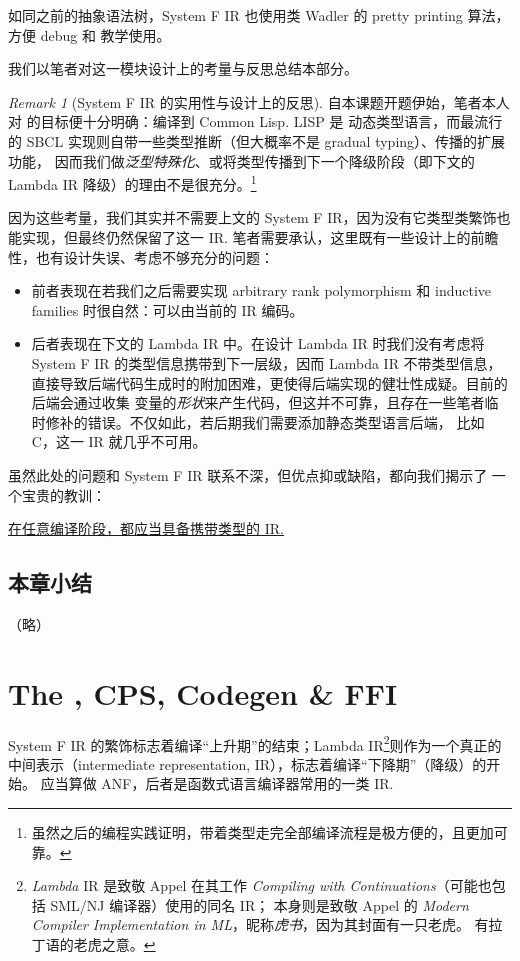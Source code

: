 \documentclass[a4paper, 11pt]{article}
\theoremstyle{remark}\newtheorem*{remark}{Remark}
\theoremstyle{definition}\newtheorem*{definition}{Definition}
\begin{document}
如同之前的抽象语法树，System F IR 也使用类 Wadler 的 pretty printing 算法，方便 debug 和
教学使用。

我们以笔者对这一模块设计上的考量与反思总结本部分。
\begin{remark}[System F IR 的实用性与设计上的反思]
  自本课题开题伊始，笔者本人对 \Tigris 的目标便十分明确：编译到 Common Lisp. LISP 是
  动态类型语言，而最流行的 SBCL 实现则自带一些类型推断（但大概率不是 gradual typing）、传播的扩展功能，
  因而我们做\emph{泛型特殊化}、或将类型传播到下一个降级阶段（即下文的 Lambda IR 降级）的理由不是很充分。\footnote{
    虽然之后的编程实践证明，带着类型走完全部编译流程是极方便的，且更加可靠。
  }

  因为这些考量，我们其实并不需要上文的 System F IR，因为没有它类型类繁饰也能实现，但最终仍然保留了这一 IR.
  笔者需要承认，这里既有一些设计上的前瞻性，也有设计失误、考虑不够充分的问题：
\begin{itemize}\itemsep0em
    \item 前者表现在若我们之后需要实现 arbitrary rank polymorphism 和 inductive families 时很自然：可以由当前的 IR 编码。
    \item 后者表现在下文的 Lambda IR 中。在设计 Lambda IR 时我们没有考虑将 System F IR 的类型信息携带到下一层级，因而
      Lambda IR 不带类型信息，直接导致后端代码生成时的附加困难，更使得后端实现的健壮性成疑。目前的后端会通过收集
      变量的\emph{形状}来产生代码，但这并不可靠，且存在一些笔者临时修补的错误。不仅如此，若后期我们需要添加静态类型语言后端，
      比如 C，这一 IR 就几乎不可用。
  \end{itemize}
  虽然此处的问题和 System F IR 联系不深，但优点抑或缺陷，都向我们揭示了
  一个宝贵的教训：
  \begin{center}
    \underline{在任意编译阶段，都应当具备携带类型的 IR.}
  \end{center}
\end{remark}

\subsection{本章小结}（略）

\section{The \Lambdair, CPS, Codegen \& FFI}
System F IR 的繁饰标志着编译“上升期”的结束；Lambda IR\footnote{
  \emph{Lambda} IR 是致敬 Appel 在其工作 \emph{Compiling with Continuations}（可能也包括 SML/NJ 编译器）使用的同名 IR；
  \Tigris 本身则是致敬 Appel 的 \emph{Modern Compiler Implementation in ML}，昵称\emph{虎书}，因为其封面有一只老虎。
  \Tigris 有拉丁语的老虎之意。
}则作为一个真正的中间表示（intermediate representation, IR），标志着编译“下降期”（降级）的开始。
\Lambdair 应当算做 ANF，后者是函数式语言编译器常用的一类 IR.
\end{document}
